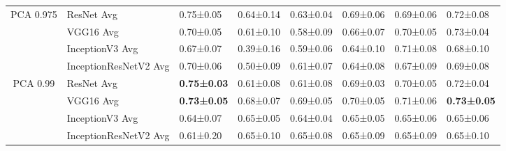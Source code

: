 \begin{landscape}
\begin{table}[]
\begin{tabular}{clllllll}
\multirow{-4}{*}{PCA 0.975} & ResNet Avg                         & 0.75±0.05                                  & 0.64±0.14                         & 0.63±0.04                         & 0.69±0.06                         & 0.69±0.06                         & 0.72±0.08                         \\
                            & VGG16 Avg                          & 0.70±0.05                                  & 0.61±0.10                         & 0.58±0.09                         & 0.66±0.07                         & 0.70±0.05                         & 0.73±0.04                         \\
                            & InceptionV3 Avg                    & 0.67±0.07                                  & 0.39±0.16                         & 0.59±0.06                         & 0.64±0.10                         & 0.71±0.08                         & 0.68±0.10                         \\
                            & InceptionResNetV2 Avg              & 0.70±0.06                                  & 0.50±0.09                         & 0.61±0.07                         & 0.64±0.08                         & 0.67±0.09                         & 0.69±0.08                         \\
\multirow{-4}{*}{PCA 0.99}  & \cellcolor[HTML]{E7E6E6}ResNet Avg & \cellcolor[HTML]{E7E6E6}\textbf{0.75±0.03} & \cellcolor[HTML]{E7E6E6}0.61±0.08 & \cellcolor[HTML]{E7E6E6}0.61±0.08 & \cellcolor[HTML]{E7E6E6}0.69±0.03 & \cellcolor[HTML]{E7E6E6}0.70±0.05 & \cellcolor[HTML]{E7E6E6}0.72±0.04 \\
                            & VGG16 Avg                          & \textbf{0.73±0.05}                         & 0.68±0.07                         & 0.69±0.05                         & 0.70±0.05                         & 0.71±0.06                         & \textbf{0.73±0.05}                \\
                            & InceptionV3 Avg                    & 0.64±0.07                                  & 0.65±0.05                         & 0.64±0.04                         & 0.65±0.05                         & 0.65±0.06                         & 0.65±0.06                         \\
                            & InceptionResNetV2 Avg              & 0.61±0.20                                  & 0.65±0.10                         & 0.65±0.08                         & 0.65±0.09                         & 0.65±0.09                         & 0.65±0.10                         \\

\end{tabular}
\end{table}
\end{landscape}
